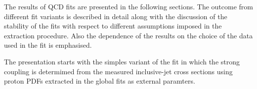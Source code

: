 The results of QCD fits are presented in the following sections. The outcome from different fit variants is described in detail along with the discussion of the stability of the fits with respect to different assumptions imposed in the \asz extraction procedure. Also the dependence of the results on the choice of the data used in the fit is emphasised.

The presentation starts with the simples variant of the fit in which the strong coupling \asz is determimed from the measured inclusive-jet cross sections using proton PDFs extracted in the global fits as external paramters.